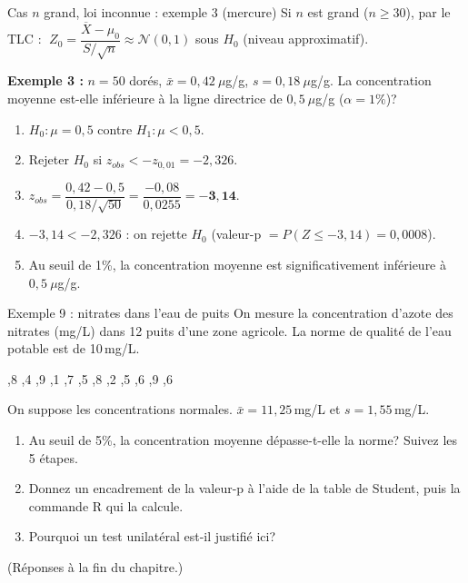 \documentclass{BeamerTemplate}
\begin{document}
\begin{frame}[t]{Cas $n$ grand, loi inconnue : exemple 3 (mercure)}
  Si $n$ est grand ($n \ge 30$), par le TLC :
  $\;Z_0 = \dfrac{\overline{X} - \mu_0}{S/\sqrt{n}} \approx \mathcal{N}(0,1)$ sous $H_0$ (niveau approximatif).

  \medskip
  \textbf{Exemple 3 :} $n = 50$ dorés, $\bar{x} = 0{,}42\ \mu$g/g, $s = 0{,}18\ \mu$g/g. La concentration moyenne est-elle \alert{inférieure} à la ligne directrice de $0{,}5\ \mu$g/g ($\alpha = 1\%$)?

  \medskip
  \begin{enumerate}\itemsep 1.5mm
    \item<2-> $H_0 : \mu = 0{,}5$ contre $H_1 : \mu < 0{,}5$.
    \item<3-> Rejeter $H_0$ si $z_{obs} < -z_{0{,}01} = -2{,}326$.
    \item<4-> $z_{obs} = \dfrac{0{,}42 - 0{,}5}{0{,}18/\sqrt{50}} = \dfrac{-0{,}08}{0{,}0255} = \mathbf{-3{,}14}$.
    \item<5-> $-3{,}14 < -2{,}326$ : on \alert{rejette $H_0$} (valeur-p $= P(Z \le -3{,}14) = 0{,}0008$).
    \item<6-> Au seuil de 1\%, la concentration moyenne est significativement inférieure à $0{,}5\ \mu$g/g.
  \end{enumerate}
\end{frame}

\begin{frame}[t]{Exemple 9 : nitrates dans l'eau de puits}
  On mesure la concentration d'azote des nitrates (mg/L) dans 12 puits d'une zone agricole. La norme de qualité de l'eau potable est de \alert{10\,mg/L}.

  \medskip
  ,8 ,4 ,9 ,1 ,7 ,5 ,8 ,2 ,5 ,6 ,9 ,6

  \raggedright
  \medskip
  On suppose les concentrations normales. $\bar{x} = 11{,}25$\,mg/L et $s = 1{,}55$\,mg/L.

  \medskip
  \begin{enumerate}\itemsep 2.5mm
    \item Au seuil de 5\%, la concentration moyenne \alert{dépasse}-t-elle la norme? Suivez les 5 étapes.
    \item Donnez un encadrement de la valeur-p à l'aide de la table de Student, puis la commande R qui la calcule.
    \item Pourquoi un test unilatéral est-il justifié ici?
  \end{enumerate}

  \medskip
  \small (Réponses à la fin du chapitre.)
\end{frame}
\end{document}
